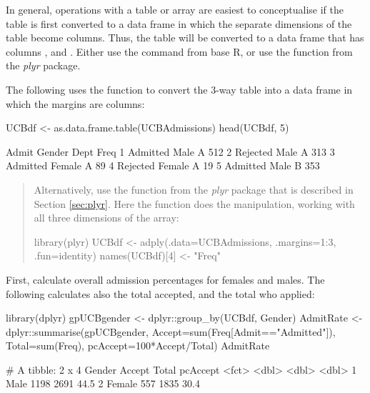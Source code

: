 In general, operations with a table or array are easiest to
conceptualise if the table is first converted to a data frame
in which the separate dimensions of the table become columns.
Thus, the  table will be converted to
a data frame that has columns ,  and
. Either use the 
command from base R, or use the  function from
the {\em plyr} package.

The following uses the function  to convert
the 3-way table  into a data frame in which the
margins are columns:
\begin{Schunk}
\begin{Sinput}
UCBdf <- as.data.frame.table(UCBAdmissions)
head(UCBdf, 5)
\end{Sinput}
\begin{Soutput}
     Admit Gender Dept Freq
1 Admitted   Male    A  512
2 Rejected   Male    A  313
3 Admitted Female    A   89
4 Rejected Female    A   19
5 Admitted   Male    B  353
\end{Soutput}
\end{Schunk}
\begin{quote}
{\small
Alternatively, use the function 
  from the {\em plyr} package that is described in Section
  \ref{sec:plyr}. Here the  function does the
manipulation, working with all three dimensions of the array:
\begin{Schunk}
\begin{Sinput}
library(plyr)
UCBdf <- adply(.data=UCBAdmissions,
               .margins=1:3,
               .fun=identity)
names(UCBdf)[4] <- "Freq"
\end{Sinput}
\end{Schunk}
}
\end{quote}
First, calculate overall admission percentages for
females and males. The following calculates also the total accepted,
and the total who applied:
\begin{fullwidth}

\begin{Schunk}
\begin{Sinput}
library(dplyr)
gpUCBgender <- dplyr::group_by(UCBdf, Gender)
AdmitRate <- dplyr::summarise(gpUCBgender,
                              Accept=sum(Freq[Admit=="Admitted"]),
                              Total=sum(Freq),
                              pcAccept=100*Accept/Total)
AdmitRate
\end{Sinput}
\begin{Soutput}
# A tibble: 2 x 4
  Gender Accept Total pcAccept
  <fct>   <dbl> <dbl>    <dbl>
1 Male     1198  2691     44.5
2 Female    557  1835     30.4
\end{Soutput}
\end{Schunk}

\end{fullwidth}

